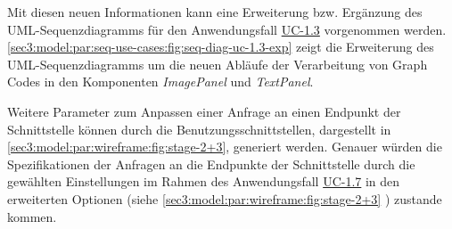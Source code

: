 


Mit diesen neuen Informationen kann eine Erweiterung bzw. Ergänzung des UML-Sequenzdiagramms für den Anwendungsfall \hyperref[sec3:model:uc-1.3]{UC-1.3} vorgenommen werden.
\cref{sec3:model:par:seq-use-cases:fig:seq-diag-uc-1.3-exp} zeigt die Erweiterung des UML-Sequenzdiagramms um die neuen Abläufe der Verarbeitung von Graph Codes in den Komponenten \textit{ImagePanel} und \textit{TextPanel}.



Weitere Parameter zum Anpassen einer Anfrage an einen Endpunkt der Schnittstelle können durch die Benutzungsschnittstellen, dargestellt in \cref{sec3:model:par:wireframe:fig:stage-2+3}, generiert werden.
Genauer würden die Spezifikationen der Anfragen an die Endpunkte der Schnittstelle durch die gewählten Einstellungen im Rahmen des Anwendungsfall \hyperref[sec3:model:uc-1.7]{UC-1.7} in den erweiterten Optionen (siehe \cref{sec3:model:par:wireframe:fig:stage-2+3} ) zustande kommen.

